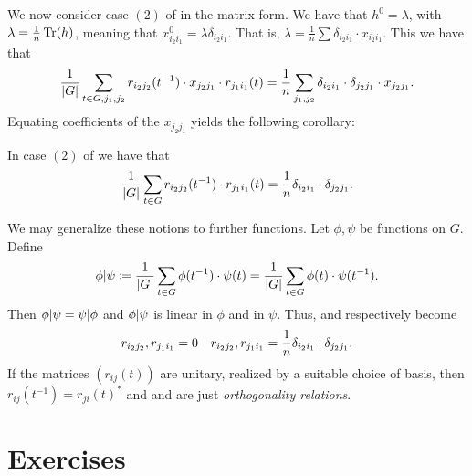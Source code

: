 \documentclass[letterpaper, 11pt, oneside]{book}
\begin{document}
We now consider case $(2)$ of  in the matrix form.
We have that $h^{0} = \lambda$, with $\lambda = \frac{1}{n} \Tr(h)$, meaning that $x_{i_{2}i_{1}}^{0} = \lambda \delta_{i_{2}i_{1}}$.
That is, $\lambda = \frac{1}{n} \sum \delta_{i_{2}i_{1}} \cdot x_{i_{2}i_{1}}$.
This we have that
\[
  \frac{1}{\abs{G}} \sum_{t \in G, j_{1}, j_{2}} r_{i_{2}j_{2}}(t^{-1}) \cdot x_{j_{2}j_{1}} \cdot r_{j_{1}i_{1}}(t) = \frac{1}{n} \sum_{j_{1}, j_{2}} \delta_{i_{2}i_{1}} \cdot \delta_{j_{2}j_{1}} \cdot x_{j_{2}j_{1}}.
\]
Equating coefficients of the $x_{j_{2}j_{1}}$ yields the following corollary:
\begin{cor}\label{cor:schurs_lemma_cor_3}
  In case $(2)$ of  we have that
  \[
    \frac{1}{\abs{G}} \sum_{t \in G} r_{i_{2}j_{2}}(t^{-1}) \cdot r_{j_{1}i_{1}}(t) = \frac{1}{n} \delta_{i_{2}i_{1}} \cdot \delta_{j_{2}j_{1}}.
  \]
\end{cor}

We may generalize these notions to further functions.
Let $\phi, \psi$ be  functions on $G$.
Define
\[
  \inner{\phi | \psi} \defeq \frac{1}{\abs{G}} \sum_{t \in G} \phi(t^{-1}) \cdot \psi(t) = \frac{1}{\abs{G}} \sum_{t \in G} \phi(t) \cdot \psi(t^{-1}).
\]
Then $\inner{\phi | \psi} = \inner{\psi | \phi}$ and $\inner{\phi | \psi}$ is linear in $\phi$ and in $\psi$.
Thus,  and  respectively become
\begin{align*}
  \inner{r_{i_{2}j_{2}}, r_{j_{1}i_{1}}} = 0 && \inner{r_{i_{2}j_{2}}, r_{j_{1}i_{1}}} = \frac{1}{n} \delta_{i_{2}i_{1}} \cdot \delta_{j_{2}j_{1}}.
\end{align*}
If the matrices $(r_{ij}(t))$ are unitary, realized by a suitable choice of basis, then $r_{ij}(t^{-1}) = r_{ji}(t)^{*}$ and  and  are just \emph{orthogonality relations}.

\clearpage

\section*{Exercises}
\end{document}
